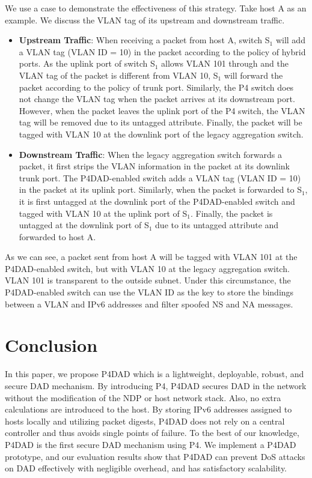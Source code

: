 \documentclass[journal]{IEEEtran}
\begin{document}
            We use a case to demonstrate the effectiveness of this strategy. Take host A as an example. We discuss the VLAN tag of its upstream and downstream traffic.
            \begin{itemize}
                \item \textbf{Upstream Traffic}: When receiving a packet from host A, switch S$_1$ will add a VLAN tag (VLAN ID = 10) in the packet according to the policy of hybrid ports. As the uplink port of switch S$_1$ allows VLAN 101 through and the VLAN tag of the packet is different from VLAN 10, S$_1$ will forward the packet according to the policy of trunk port. Similarly, the P4 switch does not change the VLAN tag when the packet arrives at its downstream port. However, when the packet leaves the uplink port of the P4 switch, the VLAN tag will be removed due to its untagged attribute. Finally, the packet will be tagged with VLAN 10 at the downlink port of the legacy aggregation switch.

                \item \textbf{Downstream Traffic}: When the legacy aggregation switch forwards a packet, it first strips the VLAN information in the packet at its downlink trunk port. The P4DAD-enabled switch adds a VLAN tag (VLAN ID = 10) in the packet at its uplink port. Similarly, when the packet is forwarded to S$_1$, it is first untagged at the downlink port of the P4DAD-enabled switch and tagged with VLAN 10 at the uplink port of S$_1$. Finally, the packet is untagged at the downlink port of S$_1$ due to its untagged attribute and forwarded to host A.
            \end{itemize}

            As we can see, a packet sent from host A will be tagged with VLAN 101 at the P4DAD-enabled switch, but with VLAN 10 at the legacy aggregation switch. VLAN 101 is transparent to the outside subnet. Under this circumstance, the P4DAD-enabled switch can use the VLAN ID as the key to store the bindings between a VLAN and IPv6 addresses and filter spoofed NS and NA messages.





\section{Conclusion}\label{sec:conclusion}
    In this paper, we propose P4DAD which is a lightweight, deployable, robust, and secure DAD mechanism. 
    By introducing P4, P4DAD secures DAD in the network without the modification of the NDP or host network stack. Also, no extra calculations are introduced to the host. By storing IPv6 addresses assigned to hosts locally and utilizing packet digests, P4DAD does not rely on a central controller and thus avoids single points of failure. 
    To the best of our knowledge, P4DAD is the first secure DAD mechanism using P4. We implement a P4DAD prototype, and our evaluation results show that P4DAD can prevent DoS attacks on DAD effectively with negligible overhead, and has satisfactory scalability. 
\end{document}
